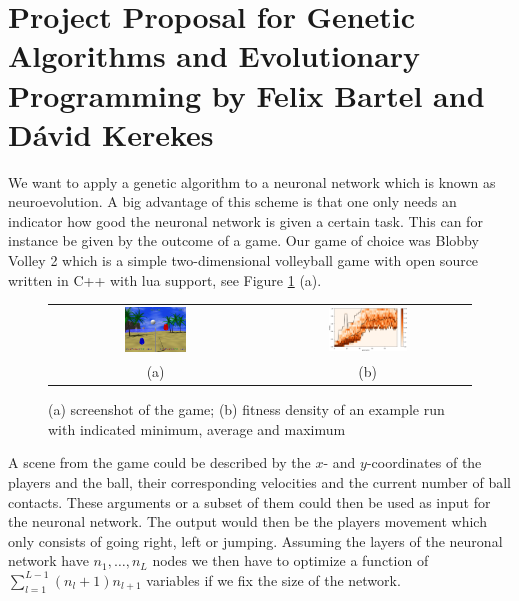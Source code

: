 \documentclass[11pt,a4paper]{scrartcl}
\date{}
\begin{document}
\section*{Project Proposal for Genetic Algorithms and Evolutionary Programming
by Felix Bartel and D\' avid Kerekes}

We want to apply a genetic algorithm to a neuronal network which is known as neuroevolution.
A big advantage of this scheme is that one only needs an indicator how good the neuronal network is given a certain task.
This can for instance be given by the outcome of a game.
Our game of choice was Blobby Volley 2 which is a simple two-dimensional volleyball game with open source written in C++ with lua support, see Figure \ref{fig:screenshot} (a).

\begin{figure}[H]
\center
\begin{tabular}{cc}
\includegraphics[width=0.3\textwidth]{img/screenshot.png}
&
\includegraphics[width=0.4\textwidth]{img/fitness.png}
\\
(a) & (b)
\end{tabular}
\caption{(a) screenshot of the game; (b) fitness density of an example run with indicated minimum, average and maximum}
\label{fig:screenshot}
\end{figure}

A scene from the game could be described by the $x$- and $y$-coordinates of the players and the ball, their corresponding velocities and the current number of ball contacts.
These arguments or a subset of them could then be used as input for the neuronal network.
The output would then be the players movement which only consists of going right, left or jumping.
Assuming the layers of the neuronal network have $n_1,\dots,n_L$ nodes we then have to optimize a function of $\sum_{l=1}^{L-1} (n_l+1)n_{l+1}$ variables if we fix the size of the network.
\end{document}

